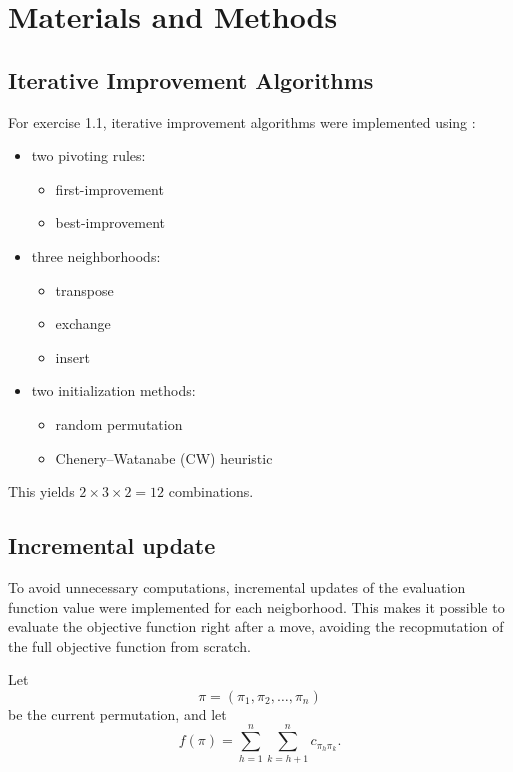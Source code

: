 \section{Materials and Methods}

\subsection{Iterative Improvement Algorithms}

For exercise 1.1, iterative improvement algorithms were implemented using :
\begin{itemize}[leftmargin=1.5em]
    \item two pivoting rules:
    \begin{itemize}
        \item first-improvement
        \item best-improvement
    \end{itemize}
    \item three neighborhoods:
    \begin{itemize}
        \item transpose
        \item exchange
        \item insert
    \end{itemize}
    \item two initialization methods:
    \begin{itemize}
        \item random permutation
        \item Chenery--Watanabe (CW) heuristic
    \end{itemize}
\end{itemize}

This yields \(2 \times 3 \times 2 = 12\) combinations.

\subsection{Incremental update }


To avoid unnecessary computations, incremental updates of the evaluation function value were implemented for each neigborhood. This makes it possible to evaluate the objective function right after a move, avoiding the recopmutation of the full objective function from scratch.

Let
\[
\pi = (\pi_1,\pi_2,\dots,\pi_n)
\]
be the current permutation, and let
\[
f(\pi)=\sum_{h=1}^{n}\sum_{k=h+1}^{n} c_{\pi_h\pi_k}.
\]

